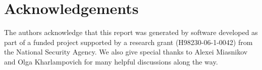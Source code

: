 \documentclass[final]{article}
\begin{document}
\section{Acknowledgements}
The authors acknowledge that this report was generated by software developed as part of a funded project supported by a research grant (H98230-06-1-0042) from the National Security Agency.  We also give special thanks to Alexei Miasnikov and Olga Kharlampovich for many helpful discussions along the way.  
\end{document}
